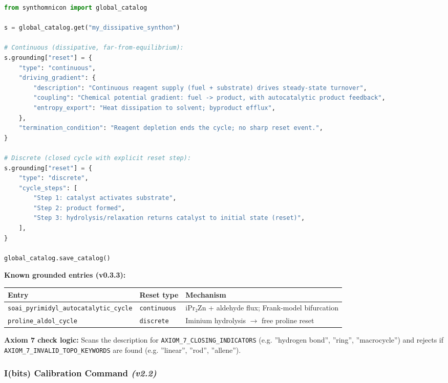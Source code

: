\documentclass[12pt,a4paper]{article}
\begin{document}
\begin{lstlisting}[language=Python]
from synthomnicon import global_catalog

s = global_catalog.get("my_dissipative_synthon")

# Continuous (dissipative, far-from-equilibrium):
s.grounding["reset"] = {
    "type": "continuous",
    "driving_gradient": {
        "description": "Continuous reagent supply (fuel + substrate) drives steady-state turnover",
        "coupling": "Chemical potential gradient: fuel -> product, with autocatalytic product feedback",
        "entropy_export": "Heat dissipation to solvent; byproduct efflux",
    },
    "termination_condition": "Reagent depletion ends the cycle; no sharp reset event.",
}

# Discrete (closed cycle with explicit reset step):
s.grounding["reset"] = {
    "type": "discrete",
    "cycle_steps": [
        "Step 1: catalyst activates substrate",
        "Step 2: product formed",
        "Step 3: hydrolysis/relaxation returns catalyst to initial state (reset)",
    ],
}

global_catalog.save_catalog()
\end{lstlisting}

\textbf{Known grounded entries (v0.3.3):}

\begin{table}[htbp]
\centering
\small
{}
\begin{tabularx}{\textwidth}{>{\centering\arraybackslash}X >{\centering\arraybackslash}X >{\centering\arraybackslash}X}
\toprule
\rowcolor{gray!25}\textbf{Entry} & \textbf{Reset type} & \textbf{Mechanism} \\
\midrule
\rowcolors{1}{white}{gray!10}
\texttt{soai\_pyrimidyl\_autocatalytic\_cycle} & \texttt{continuous} & iPr₂Zn + aldehyde flux; Frank-model bifurcation \\
\texttt{proline\_aldol\_cycle} & \texttt{discrete} & Iminium hydrolysis $\rightarrow$ free proline reset \\
\bottomrule
\end{tabularx}
\end{table}

\textbf{Axiom 7 check logic:}
Scans the description for \texttt{AXIOM\_7\_CLOSING\_INDICATORS} (e.g. ''hydrogen bond'', ''ring'', ''macrocycle'') and rejects if \texttt{AXIOM\_7\_INVALID\_TOPO\_KEYWORDS} are found (e.g. ''linear'', ''rod'', ''allene'').

\subsubsection{I(bits) Calibration Command \emph{(v2.2)}}
\end{document}
